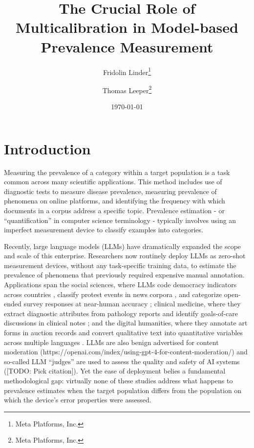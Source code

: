 \documentclass[12pt]{article}
\title{The Crucial Role of Multicalibration in Model-based Prevalence Measurement}
\author{
  Fridolin Linder\thanks{Meta Platforms, Inc.} \and
  Thomas Leeper\thanks{Meta Platforms, Inc.}
}
\date{\today}
\begin{document}
\maketitle

\begin{abstract}
\end{abstract}

\section{Introduction}

Measuring the prevalence of a category within a target population is a task common across many scientific applications. This method includes use of diagnostic tests to measure disease prevalence, measuring prevalence of phenomena on online platforms, and identifying the frequency with which documents in a corpus address a specific topic. Prevalence estimation - or “quantification” in computer science terminology - typically involves using an imperfect measurement device to classify examples into categories.

Recently, large language models (LLMs) have dramatically expanded the scope and scale of this enterprise. Researchers now routinely deploy LLMs as zero-shot measurement devices, without any task-specific training data, to estimate the prevalence of phenomena that previously required expensive manual annotation. Applications span the social sciences, where LLMs code democracy indicators across countries \citep{weidmann2025democracy}, classify protest events in news corpora \citep{overos2024protest}, and categorize open-ended survey responses at near-human accuracy \citep{mellon2024survey, gilardi2023chatgpt}; clinical medicine, where they extract diagnostic attributes from pathology reports \citep{sushil2024clinical} and identify goals-of-care discussions in clinical notes \citep{sibley2025goc}; and the digital humanities, where they annotate art forms in auction records \citep{tojima2025art} and convert qualitative text into quantitative variables across multiple languages \citep{karjus2025mixed}. LLMs are also benign advertised for content moderation (https://openai.com/index/using-gpt-4-for-content-moderation/) and so-called LLM “judges” are used to assess the quality and safety of AI systems ([TODO: Pick citation]). Yet the ease of deployment belies a fundamental methodological gap: virtually none of these studies address what happens to prevalence estimates when the target population differs from the population on which the device's error properties were assessed.
\end{document}
